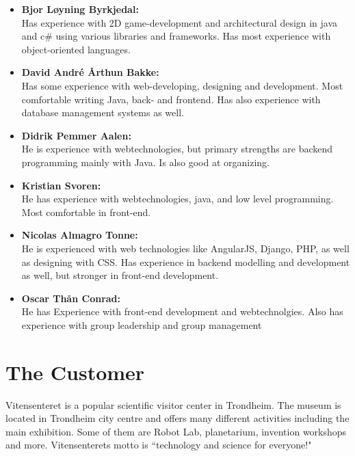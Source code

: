\begin{itemize}
\item \textbf{Bjor Løyning Byrkjedal:}\\
Has experience with 2D game-development and architectural design in java and c\# using various libraries and frameworks. Has most experience with object-oriented languages.

\item \textbf{David André Årthun Bakke:}\\
Has some experience with web-developing, designing and development. Most comfortable writing Java, back- and frontend. Has also experience with database management systems as well. 

\item \textbf{Didrik Pemmer Aalen:}\\
He is experience with webtechnologies, but primary strengths are backend programming mainly with Java. Is also good at organizing.

\item \textbf{Kristian Svoren:}\\
He has experience with webtechnologies, java, and low level programming. Most comfortable in front-end.

\item \textbf{Nicolas Almagro Tonne:}\\
He is experienced with web technologies like AngularJS, Django, PHP, as well as designing with CSS. Has experience in backend modelling and development as well, but stronger in front-end development. 

\item \textbf{Oscar Thån Conrad:}\\
He has Experience with front-end development and webtechnolgies. Also has experience with group leadership and group management 
\end{itemize}

\section{The Customer}
Vitensenteret\cite{customer} is a popular scientific visitor center in Trondheim. The museum is located in Trondheim city centre and offers many different activities including the main exhibition. Some of them are Robot Lab, planetarium, invention workshops and more. Vitensenterets motto is ``technology and science for everyone!"

